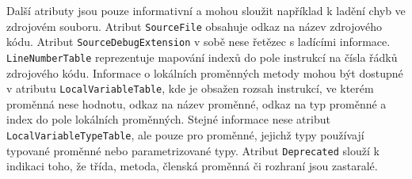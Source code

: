 
Další atributy jsou pouze informativní a mohou sloužit například k ladění chyb ve zdrojovém souboru. Atribut \texttt{SourceFile} obsahuje odkaz na název zdrojového kódu. Atribut \texttt{SourceDebugExtension} v sobě nese řetězec s ladícími informace. \texttt{LineNumberTable} reprezentuje mapování indexů do pole instrukcí na čísla řádků zdrojového kódu. Informace o lokálních proměnných metody mohou být dostupné v atributu \texttt{LocalVariableTable}, kde je obsažen rozsah instrukcí, ve kterém proměnná nese hodnotu, odkaz na název proměnné, odkaz na typ proměnné a index do pole lokálních proměnných. Stejné informace nese atribut \texttt{LocalVariableTypeTable}, ale pouze pro proměnné, jejichž typy používají typované proměnné nebo parametrizované typy. Atribut \texttt{Deprecated} slouží k indikaci toho, že třída, metoda, členská proměnná či rozhraní jsou zastaralé.

